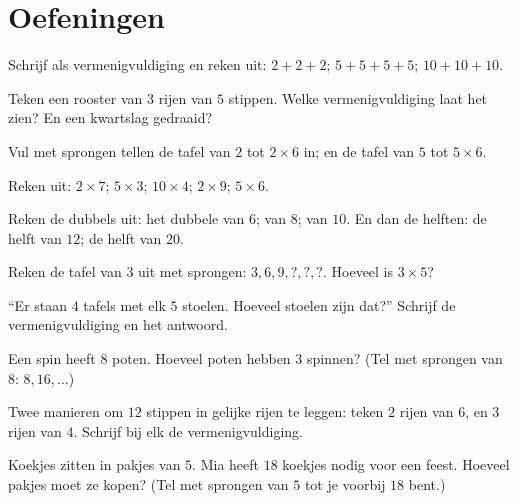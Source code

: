 \section{Oefeningen}

\begin{exercise}[$\star$]\label{exo:g2:mult:1}
Schrijf als vermenigvuldiging en reken uit: $2 + 2 + 2$; \quad
$5 + 5 + 5 + 5$; \quad $10 + 10 + 10$.
\end{exercise}

\begin{exercise}[$\star$]\label{exo:g2:mult:2}
Teken een rooster van $3$ rijen van $5$ stippen. Welke
vermenigvuldiging laat het zien? En een kwartslag gedraaid?
\end{exercise}

\begin{exercise}[$\star$]\label{exo:g2:mult:3}
Vul met sprongen tellen de tafel van $2$ tot $2 \times 6$ in; en de
tafel van $5$ tot $5 \times 6$.
\end{exercise}

\begin{exercise}[$\star$]\label{exo:g2:mult:4}
Reken uit: $2 \times 7$; \quad $5 \times 3$; \quad $10 \times 4$;
\quad $2 \times 9$; \quad $5 \times 6$.
\end{exercise}

\begin{exercise}[$\star$]\label{exo:g2:mult:5}
Reken de dubbels uit: het dubbele van $6$; van $8$; van $10$. En dan de
helften: de helft van $12$; de helft van $20$.
\end{exercise}

\begin{exercise}[$\star$]\label{exo:g2:mult:6}
Reken de tafel van $3$ uit met sprongen: $3, 6, 9, ?, ?, ?$. Hoeveel is
$3 \times 5$?
\end{exercise}

\begin{exercise}[$\star$]\label{exo:g2:mult:7}
``Er staan $4$ tafels met elk $5$ stoelen. Hoeveel stoelen zijn dat?''
Schrijf de vermenigvuldiging en het antwoord.
\end{exercise}

\begin{exercise}[$\star$]\label{exo:g2:mult:8}
Een spin heeft $8$ poten. Hoeveel poten hebben $3$ spinnen? (Tel met
sprongen van $8$: $8, 16, \dots$)
\end{exercise}

\begin{exercise}[$\star$]\label{exo:g2:mult:9}
Twee manieren om $12$ stippen in gelijke rijen te leggen: teken $2$
rijen van $6$, en $3$ rijen van $4$. Schrijf bij elk de
vermenigvuldiging.
\end{exercise}

\begin{exercise}[$\star\star$]\label{exo:g2:mult:10}
Koekjes zitten in pakjes van $5$. Mia heeft $18$ koekjes nodig voor een
feest. Hoeveel pakjes moet ze kopen? (Tel met sprongen van $5$ tot je
voorbij $18$ bent.)
\end{exercise}
